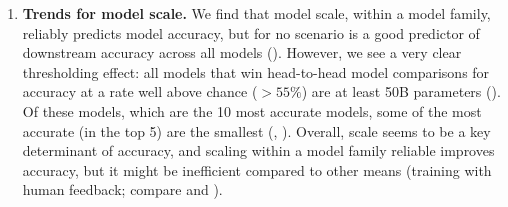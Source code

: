 \begin{enumerate}
    \item \textbf{Trends for model scale.}
    We find that model scale, within a model family, reliably predicts model accuracy, but for no scenario is a good predictor of downstream accuracy across all models ().
    However, we see a very clear thresholding effect: all models that win head-to-head model comparisons for accuracy at a rate well above chance (\ie $>55\%$) are at least 50B parameters ().
    Of these models, which are the 10 most accurate models, some of the most accurate (\ie in the top 5) are the smallest (\anthropic, \coherexl).
    Overall, scale seems to be a key determinant of accuracy, and scaling within a model family reliable improves accuracy, but it might be inefficient compared to other means (\eg training with human feedback; compare \mtnlgfivethreezero and \anthropic).
\end{enumerate}